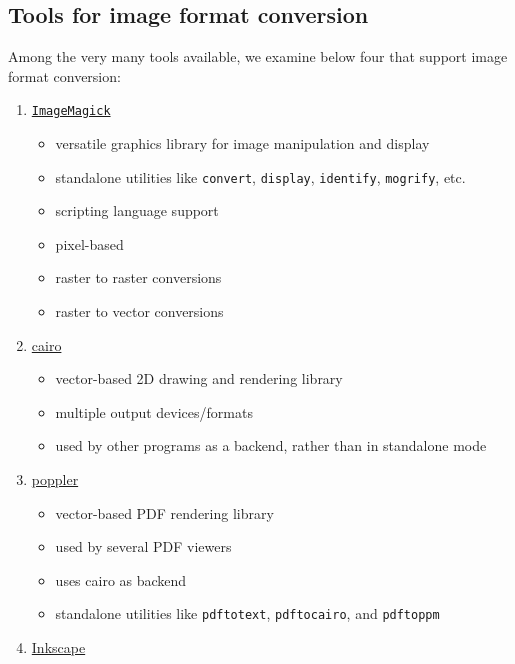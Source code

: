 \documentclass[
  12pt,
  british,
  a4paper,
  rgb,
  dvipsnames,
  svgnames,
  hyphens]{article}
\providecommand{\tightlist}{%
  \setlength{\itemsep}{0pt}\setlength{\parskip}{0pt}}
\begin{document}
\hypertarget{tools-for-image-format-conversion}{%
\subsection{Tools for image format
conversion}\label{tools-for-image-format-conversion}}

Among the very many tools available, we examine below four that support
image format conversion:

\begin{enumerate}
\tightlist
\item
  \href{https://imagemagick.org/index.php}{\texttt{ImageMagick}}

  \begin{itemize}
  \tightlist
  \item
    versatile graphics library for image manipulation and display
  \item
    standalone utilities like \texttt{convert}, \texttt{display},
    \texttt{identify}, \texttt{mogrify}, etc.
  \item
    scripting language support
  \item
    pixel-based
  \item
    raster to raster conversions
  \item
    raster to vector conversions
  \end{itemize}
\item
  \href{https://www.cairographics.org/}{cairo}

  \begin{itemize}
  \tightlist
  \item
    vector-based 2D drawing and rendering library
  \item
    multiple output devices/formats
  \item
    used by other programs as a backend, rather than in standalone mode
  \end{itemize}
\item
  \href{https://poppler.freedesktop.org/}{poppler}

  \begin{itemize}
  \tightlist
  \item
    vector-based PDF rendering library
  \item
    used by several PDF viewers
  \item
    uses cairo as backend
  \item
    standalone utilities like \texttt{pdftotext}, \texttt{pdftocairo},
    and \texttt{pdftoppm}
  \end{itemize}
\item
  \href{https://inkscape.org/}{Inkscape}


\end{enumerate}
\end{document}
